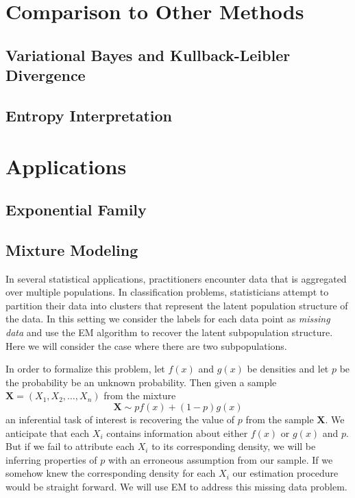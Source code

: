 \documentclass{article}
\begin{document}
\section{Comparison to Other Methods}

\subsection{Variational Bayes and  Kullback-Leibler Divergence}

\subsection{Entropy Interpretation}

\section{Applications}
\subsection{Exponential Family}

\subsection{Mixture Modeling}

In several statistical applications, practitioners encounter data that is aggregated over multiple populations. In classification problems, statisticians attempt to partition their data into clusters that represent the latent population structure of the data. In this setting we consider the labels for each data point as \textit{missing data} and use the EM algorithm to recover the latent subpopulation structure. Here we will consider the case where there are two subpopulations. 

In order to formalize this problem, let $f(x)$ and $g(x)$ be densities and let $p$ be the probability be an unknown probability. Then given a sample $\mathbf{X} = (X_1, X_2, \ldots, X_n)$ from the mixture $$\mathbf{X}\sim pf(x) + (1-p)g(x)$$ an inferential task of interest is recovering the value of $p$ from the sample $\mathbf{X}$. We anticipate that each $X_i$ contains information about either $f(x)$ or $g(x)$ and $p$. But if we fail to attribute each $X_i$ to its corresponding density, we will be inferring properties of $p$ with an erroneous assumption from our sample. If we somehow knew the corresponding density for each $X_i$ our estimation procedure would be straight forward. We will use EM to address this missing data problem. 
\end{document}
